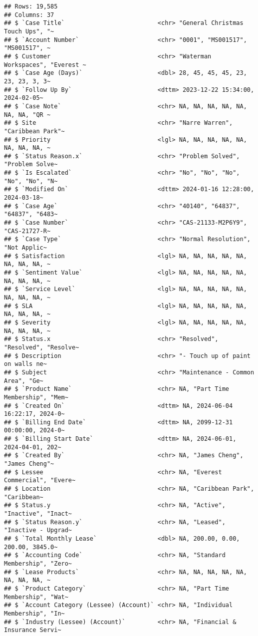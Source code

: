 \documentclass[
]{article}
\begin{document}
\begin{verbatim}
## Rows: 19,585
## Columns: 37
## $ `Case Title`                          <chr> "General Christmas Touch Ups", "~
## $ `Account Number`                      <chr> "0001", "MS001517", "MS001517", ~
## $ Customer                              <chr> "Waterman Workspaces", "Everest ~
## $ `Case Age (Days)`                     <dbl> 28, 45, 45, 45, 23, 23, 23, 3, 3~
## $ `Follow Up By`                        <dttm> 2023-12-22 15:34:00, 2024-02-05~
## $ `Case Note`                           <chr> NA, NA, NA, NA, NA, NA, NA, "QR ~
## $ Site                                  <chr> "Narre Warren", "Caribbean Park"~
## $ Priority                              <lgl> NA, NA, NA, NA, NA, NA, NA, NA, ~
## $ `Status Reason.x`                     <chr> "Problem Solved", "Problem Solve~
## $ `Is Escalated`                        <chr> "No", "No", "No", "No", "No", "N~
## $ `Modified On`                         <dttm> 2024-01-16 12:28:00, 2024-03-18~
## $ `Case Age`                            <chr> "40140", "64837", "64837", "6483~
## $ `Case Number`                         <chr> "CAS-21133-M2P6Y9", "CAS-21727-R~
## $ `Case Type`                           <chr> "Normal Resolution", "Not Applic~
## $ Satisfaction                          <lgl> NA, NA, NA, NA, NA, NA, NA, NA, ~
## $ `Sentiment Value`                     <lgl> NA, NA, NA, NA, NA, NA, NA, NA, ~
## $ `Service Level`                       <lgl> NA, NA, NA, NA, NA, NA, NA, NA, ~
## $ SLA                                   <lgl> NA, NA, NA, NA, NA, NA, NA, NA, ~
## $ Severity                              <lgl> NA, NA, NA, NA, NA, NA, NA, NA, ~
## $ Status.x                              <chr> "Resolved", "Resolved", "Resolve~
## $ Description                           <chr> "- Touch up of paint on walls ne~
## $ Subject                               <chr> "Maintenance - Common Area", "Ge~
## $ `Product Name`                        <chr> NA, "Part Time Membership", "Mem~
## $ `Created On`                          <dttm> NA, 2024-06-04 16:22:17, 2024-0~
## $ `Billing End Date`                    <dttm> NA, 2099-12-31 00:00:00, 2024-0~
## $ `Billing Start Date`                  <dttm> NA, 2024-06-01, 2024-04-01, 202~
## $ `Created By`                          <chr> NA, "James Cheng", "James Cheng"~
## $ Lessee                                <chr> NA, "Everest Commercial", "Evere~
## $ Location                              <chr> NA, "Caribbean Park", "Caribbean~
## $ Status.y                              <chr> NA, "Active", "Inactive", "Inact~
## $ `Status Reason.y`                     <chr> NA, "Leased", "Inactive - Upgrad~
## $ `Total Monthly Lease`                 <dbl> NA, 200.00, 0.00, 200.00, 3845.0~
## $ `Accounting Code`                     <chr> NA, "Standard Membership", "Zero~
## $ `Lease Products`                      <chr> NA, NA, NA, NA, NA, NA, NA, NA, ~
## $ `Product Category`                    <chr> NA, "Part Time Membership", "Wat~
## $ `Account Category (Lessee) (Account)` <chr> NA, "Individual Membership", "In~
## $ `Industry (Lessee) (Account)`         <chr> NA, "Financial & Insurance Servi~
\end{verbatim}
\end{document}

